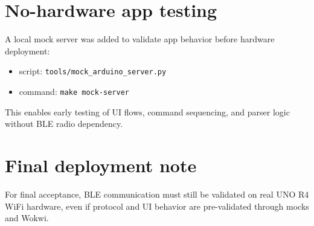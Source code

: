 \section{No-hardware app testing}
A local mock server was added to validate app behavior before hardware deployment:

\begin{itemize}
  \item script: \texttt{tools/mock\_arduino\_server.py}
  \item command: \texttt{make mock-server}
\end{itemize}

This enables early testing of UI flows, command sequencing, and parser logic without BLE radio dependency.

\section{Final deployment note}
For final acceptance, BLE communication must still be validated on real UNO R4 WiFi hardware, even if protocol and UI behavior are pre-validated through mocks and Wokwi.
